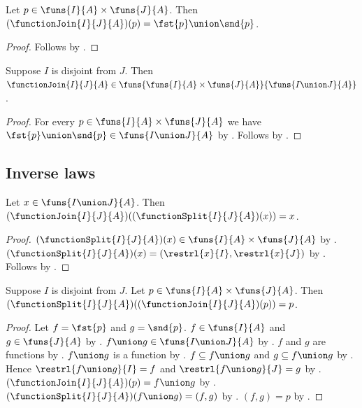 \begin{proposition}\label{function_join_apply}
    Let $p\in\funs{I}{A}\times\funs{J}{A}$.
    Then $(\functionJoin{I}{J}{A})(p)=\fst{p}\union\snd{p}$.
\end{proposition}
\begin{proof}
    Follows by .
\end{proof}

\begin{proposition}\label{function_join_type}
    Suppose $I$ is disjoint from $J$.
    Then $\functionJoin{I}{J}{A}\in
        \funs{\funs{I}{A}\times\funs{J}{A}}{\funs{I\union J}{A}}$.
\end{proposition}
\begin{proof}
    For every $p\in\funs{I}{A}\times\funs{J}{A}$ we have
        $\fst{p}\union\snd{p}\in\funs{I\union J}{A}$ by
        .
    Follows by .
\end{proof}

\subsection{Inverse laws}

\begin{theorem}\label{function_join_split_apply}
    Let $x\in\funs{I\union J}{A}$.
    Then $(\functionJoin{I}{J}{A})((\functionSplit{I}{J}{A})(x))=x$.
\end{theorem}
\begin{proof}
    $(\functionSplit{I}{J}{A})(x)\in\funs{I}{A}\times\funs{J}{A}$ by
        .
    $(\functionSplit{I}{J}{A})(x)=(\restrl{x}{I},\restrl{x}{J})$ by
        .
    Follows by .
\end{proof}

\begin{theorem}\label{function_split_join_apply}
    Suppose $I$ is disjoint from $J$.
    Let $p\in\funs{I}{A}\times\funs{J}{A}$.
    Then $(\functionSplit{I}{J}{A})((\functionJoin{I}{J}{A})(p))=p$.
\end{theorem}
\begin{proof}
    Let $f=\fst{p}$ and $g=\snd{p}$.
    $f\in\funs{I}{A}$ and $g\in\funs{J}{A}$ by .
    $f\union g\in\funs{I\union J}{A}$ by .
    $f$ and $g$ are functions by .
    $f\union g$ is a function by .
    $f\subseteq f\union g$ and $g\subseteq f\union g$ by .
    Hence $\restrl{f\union g}{I}=f$ and $\restrl{f\union g}{J}=g$ by
        .
    $(\functionJoin{I}{J}{A})(p)=f\union g$ by .
    $(\functionSplit{I}{J}{A})(f\union g)=(f,g)$ by .
    $(f,g)=p$ by .
\end{proof}


